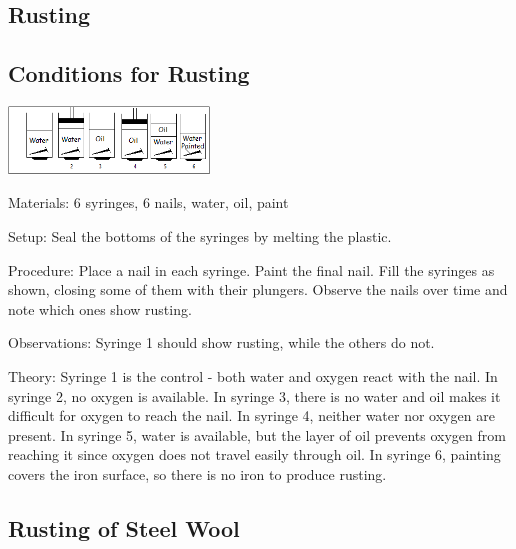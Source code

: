 \begin{multicols}{2}
\section*{Rusting}


\subsection{Conditions for Rusting}

\begin{center}
\includegraphics[width=0.4\textwidth]{./img/rusting-nails-6.png}
\end{center}

\begin{description*}
\item[Materials:]{6 syringes, 6 nails, water, oil, paint}
\item[Setup:]{Seal the bottoms of the syringes by melting the plastic.}
\item[Procedure:]{Place a nail in each syringe. Paint the final nail. Fill the syringes as shown, closing some of them with their plungers. Observe the nails over time and note which ones show rusting.}
\item[Observations:]{Syringe 1 should show rusting, while the others do not.}
\item[Theory:]{Syringe 1 is the control - both water and oxygen react with the nail. In syringe 2, no oxygen is available. In syringe 3, there is no water and oil makes it difficult for oxygen to reach the nail. In syringe 4, neither water nor oxygen are present. In syringe 5, water is available, but the layer of oil prevents oxygen from reaching it since oxygen does not travel easily through oil. In syringe 6, painting covers the iron surface, so there is no iron to produce rusting.}
\end{description*}

\subsection{Rusting of Steel Wool} %


\end{multicols}
